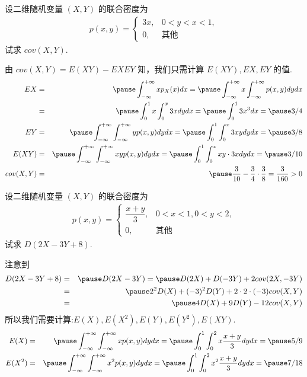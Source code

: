 \begin{frame}
	\vspace{0.3cm}
	\begin{exam}
		设二维随机变量 $(X,Y)$ 的联合密度为
		\begin{eqnarray*}
			p(x,y)=\left\{
			\begin{array}{ll}
				3x, & 0<y<x<1,\\
				0, &\mbox{其他}
			\end{array}
			\right.
		\end{eqnarray*}
		试求 $cov (X,Y)$.
	\end{exam}

	\pause \jieda  由 $cov (X,Y)=E (XY)-EXEY$ 知，我们只需计算 $E (XY), EX, EY$ 的值.
	\begin{eqnarray*}
		EX&=&\pause \int_{-\infty}^{+\infty}xp_X(x)dx=\pause \int_{-\infty}^{+\infty}x\int_{-\infty}^{+\infty}p(x,y)dydx\\
		&=&\pause \int_0^1x\int_0^x3xdydx=\pause \int_0^13x^3dx=\pause 3/4\\
		EY&=&\pause \int_{-\infty}^{+\infty}\int_{-\infty}^{+\infty}yp(x,y)dydx=\pause \int_0^1\int_0^x3xydydx=\pause 3/8\\
		E(XY)&=&\pause \int_{-\infty}^{+\infty}\int_{-\infty}^{+\infty}xyp(x,y)dydx=\pause \int_0^1\int_0^xxy\cdot 3xdydx=\pause 3/10\\
		cov(X,Y)&=&\pause \dfrac{3}{10}-\dfrac{3}{4}\cdot \dfrac{3}{8}=\dfrac{3}{160}>0
	\end{eqnarray*}

\end{frame}
\begin{frame}
	\vspace{0.3cm}
	\begin{exam}
		设二维随机变量 $(X,Y)$ 的联合密度为
		\begin{eqnarray*}
			p(x,y)=\left\{
			\begin{array}{ll}
				\dfrac{x+y}{3}, & 0<x<1, 0<y<2,\\
				0, &\mbox{其他}
			\end{array}
			\right.
		\end{eqnarray*}
		试求 $D (2X-3Y+8)$.
	\end{exam}

	\pause
	\jieda 注意到
	\begin{eqnarray*}
		D(2X-3Y+8)&=&\pause D(2X-3Y)= \pause D(2X)+D(-3Y)+2cov(2X,-3Y)\\
		&=&\pause 2^2D(X)+(-3)^2D(Y)+2\cdot2\cdot (-3)cov(X,Y)\\
		&=&\pause 4D(X)+9D(Y)-12cov(X,Y)
	\end{eqnarray*}
	\pause 所以我们需要计算:$E (X),E (X^2), E (Y), E (Y^2), E (XY)$.
	\pause
	\begin{eqnarray*}
		E(X)&=&\pause \int_{-\infty}^{+\infty}\int_{-\infty}^{+\infty}xp(x,y)dydx=\pause \int_0^1\int_0^2x\dfrac{x+y}{3}dydx=\pause 5/9\\
		E(X^2)&=&\pause \int_{-\infty}^{+\infty}\int_{-\infty}^{+\infty}x^2p(x,y)dydx=\pause \int_0^1\int_0^2x^2\dfrac{x+y}{3}dydx=\pause 7/18\\
	\end{eqnarray*}

\end{frame}

